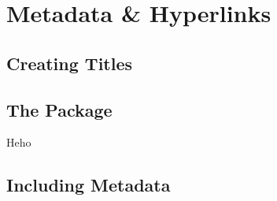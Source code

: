 \section{Metadata \& Hyperlinks}


\subsection{Creating Titles}
\begin{frame}

\end{frame}

\subsection{The  Package}
\begin{frame}[label=more_for_hyperref]{Heho}

\end{frame}

\subsection{Including Metadata}
\begin{frame}

\end{frame}
